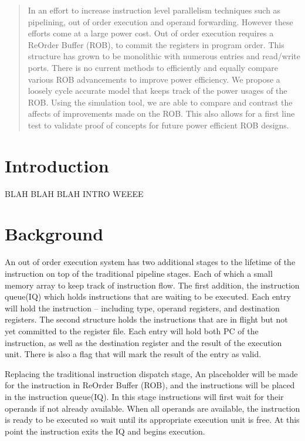 \documentclass{acm_proc_article-sp}
\begin{document}
\maketitle
\begin{abstract}
        In an effort to increase instruction level parallelism techniques such
as pipelining, out of order execution and operand forwarding.  However
these efforts come at a large power cost.  Out of order execution requires
a ReOrder Buffer (ROB), to commit the registers in program order.  This
structure has grown to be monolithic with numerous entries and read/write ports.
There is no current methods to efficiently and equally compare various
ROB advancements to improve power efficiency. We propose a loosely cycle
accurate model that keeps track of the power usages of the ROB.  Using the 
simulation tool, we are able to compare and contrast the affects of improvements
made on the ROB.  This also allows for a first line test to validate proof of
concepts for future power efficient ROB designs.
\end{abstract}



\section{Introduction}
BLAH BLAH BLAH INTRO WEEEE
\section{Background}
    An out of order execution system has two additional stages 
to the lifetime of the instruction on top of the traditional pipeline 
stages.  Each of which a small memory array to keep track of instruction flow.
The first addition, the instruction queue(IQ) which holds instructions that are 
waiting to be executed.  Each entry will hold the instruction -- including 
type, operand registers, and destination registers.  The second structure 
holds the instructions that are in flight but not yet committed to the register
file. Each entry will hold both PC of the instruction, as well as the destination
register and the result of the execution unit.  There is also a flag that will
mark the result of the entry as valid.  

Replacing the traditional instruction dispatch stage, An placeholder will be made for the
instruction in ReOrder Buffer (ROB), and the instructions will be placed
in the instruction queue(IQ). In this stage instructions will first wait for their operands if not already
available.  When all operands are available, the instruction is ready to
be executed so wait until its appropriate execution unit is free.  At this
point the instruction exits the IQ and begins execution.
\end{document}
